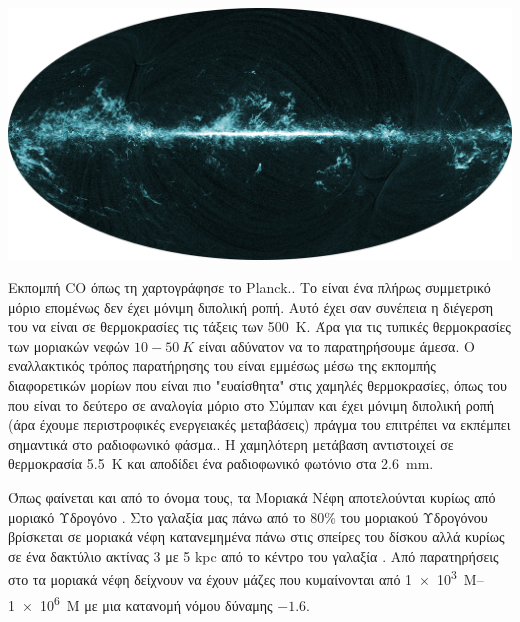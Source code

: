 \documentclass[article,a4paper,11.2pt]{memoir}
\numberwithin{equation}{subsection}
\begin{document}
\begin{marginfigure}
	\label{fig:CO}
	\centering
	\includegraphics[width=1\linewidth]{Images/CO.png}
	\caption{Εκπομπή CO όπως τη χαρτογράφησε το Planck.\cite{planck_2014}.
		\newline
		Το  είναι ένα πλήρως συμμετρικό μόριο επομένως δεν έχει μόνιμη διπολική ροπή. Αυτό έχει σαν συνέπεια η διέγερση του να είναι σε θερμοκρασίες τις τάξεις των \SI{500}{K}. Άρα για τις τυπικές θερμοκρασίες των μοριακών νεφών $10-50\ K$ είναι αδύνατον να το παρατηρήσουμε άμεσα.
		\newline
		Ο εναλλακτικός τρόπος παρατήρησης του  είναι εμμέσως μέσω της εκπομπής διαφορετικών μορίων που είναι πιο "ευαίσθητα" στις χαμηλές θερμοκρασίες, όπως του  που είναι το δεύτερο σε αναλογία μόριο στο Σύμπαν και έχει μόνιμη διπολική ροπή (άρα έχουμε περιστροφικές ενεργειακές μεταβάσεις) πράγμα του επιτρέπει να εκπέμπει σημαντικά στο ραδιοφωνικό φάσμα.. 
		\newline
		H χαμηλότερη μετάβαση αντιστοιχεί σε θερμοκρασία \SI{5.5}{K} και αποδίδει ένα ραδιοφωνικό φωτόνιο στα \SI{2.6}{mm}.
	}
	
\end{marginfigure}

Όπως φαίνεται και από το όνομα τους, τα Μοριακά Νέφη αποτελούνται κυρίως από μοριακό Υδρογόνο . Στο γαλαξία μας πάνω από το 80\% του μοριακού Υδρογόνου βρίσκεται σε μοριακά νέφη κατανεμημένα πάνω στις σπείρες του δίσκου αλλά κυρίως σε ένα δακτύλιο ακτίνας 3 με 5 kpc από το κέντρο του γαλαξία \cite{rathborne_2009}.  Από παρατηρήσεις στο  τα μοριακά νέφη δείχνουν να έχουν μάζες που κυμαίνονται από \SIrange{1e3}{1e6}{M_\odot} με μια κατανομή νόμου δύναμης $-1.6$. \cite{stahlern_2004}
\end{document}
